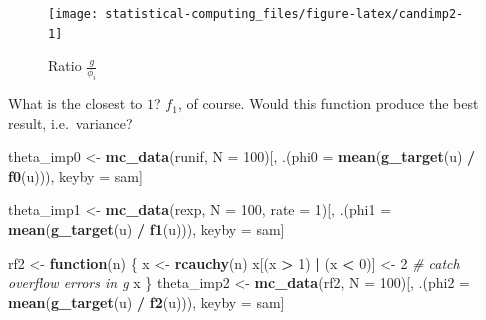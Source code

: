 \documentclass[]{book}
\newenvironment{Shaded}{\begin{snugshade}}{\end{snugshade}}
\newcommand{\CommentTok}[1]{\textcolor[rgb]{0.56,0.35,0.01}{\textit{#1}}}
\newcommand{\ControlFlowTok}[1]{\textcolor[rgb]{0.13,0.29,0.53}{\textbf{#1}}}
\newcommand{\DataTypeTok}[1]{\textcolor[rgb]{0.13,0.29,0.53}{#1}}
\newcommand{\DecValTok}[1]{\textcolor[rgb]{0.00,0.00,0.81}{#1}}
\newcommand{\KeywordTok}[1]{\textcolor[rgb]{0.13,0.29,0.53}{\textbf{#1}}}
\newcommand{\NormalTok}[1]{#1}
\newcommand{\OperatorTok}[1]{\textcolor[rgb]{0.81,0.36,0.00}{\textbf{#1}}}
\newcommand{\StringTok}[1]{\textcolor[rgb]{0.31,0.60,0.02}{#1}}
\theoremstyle{definition}
\theoremstyle{definition}
\theoremstyle{definition}
\theoremstyle{remark}
\begin{document}
\begin{figure}[H]

{\centering \texttt{[image: statistical-computing\_files/figure-latex/candimp2-1]} 

}

\caption{Ratio $\frac{g}{\phi_i}$}\label{fig:candimp2}
\end{figure}

What is the closest to \(1\)? \(f_1\), of course. Would this function produce the best result, i.e.~variance?

\begin{Shaded}
\begin{Highlighting}[]
\NormalTok{theta_imp0 <-}
\StringTok{  }\KeywordTok{mc_data}\NormalTok{(runif, }\DataTypeTok{N =} \DecValTok{100}\NormalTok{)[,}
\NormalTok{                          .(}\DataTypeTok{phi0 =} \KeywordTok{mean}\NormalTok{(}\KeywordTok{g_target}\NormalTok{(u) }\OperatorTok{/}\StringTok{ }\KeywordTok{f0}\NormalTok{(u))),}
\NormalTok{                          keyby =}\StringTok{ }\NormalTok{sam]}
\end{Highlighting}
\end{Shaded}

\begin{Shaded}
\begin{Highlighting}[]
\NormalTok{theta_imp1 <-}
\StringTok{  }\KeywordTok{mc_data}\NormalTok{(rexp, }\DataTypeTok{N =} \DecValTok{100}\NormalTok{, }\DataTypeTok{rate =} \DecValTok{1}\NormalTok{)[,}
\NormalTok{                                   .(}\DataTypeTok{phi1 =} \KeywordTok{mean}\NormalTok{(}\KeywordTok{g_target}\NormalTok{(u) }\OperatorTok{/}\StringTok{ }\KeywordTok{f1}\NormalTok{(u))),}
\NormalTok{                                   keyby =}\StringTok{ }\NormalTok{sam]}
\end{Highlighting}
\end{Shaded}

\begin{Shaded}
\begin{Highlighting}[]
\NormalTok{rf2 <-}\StringTok{ }\ControlFlowTok{function}\NormalTok{(n) \{}
\NormalTok{  x <-}\StringTok{ }\KeywordTok{rcauchy}\NormalTok{(n)}
\NormalTok{  x[(x }\OperatorTok{>}\StringTok{ }\DecValTok{1}\NormalTok{) }\OperatorTok{|}\StringTok{ }\NormalTok{(x }\OperatorTok{<}\StringTok{ }\DecValTok{0}\NormalTok{)] <-}\StringTok{ }\DecValTok{2} \CommentTok{# catch overflow errors in g}
\NormalTok{  x}
\NormalTok{\}}
\NormalTok{theta_imp2 <-}
\StringTok{  }\KeywordTok{mc_data}\NormalTok{(rf2, }\DataTypeTok{N =} \DecValTok{100}\NormalTok{)[,}
\NormalTok{                        .(}\DataTypeTok{phi2 =} \KeywordTok{mean}\NormalTok{(}\KeywordTok{g_target}\NormalTok{(u) }\OperatorTok{/}\StringTok{ }\KeywordTok{f2}\NormalTok{(u))),}
\NormalTok{                        keyby =}\StringTok{ }\NormalTok{sam]}
\end{Highlighting}
\end{Shaded}
\end{document}
